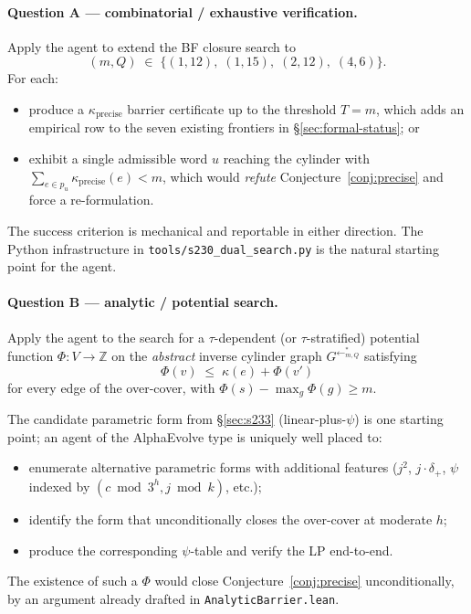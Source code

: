 \documentclass[11pt,a4paper]{article}
\theoremstyle{plain}
\theoremstyle{definition}
\newcommand{\ZZ}{\mathbb{Z}}
\newcommand{\InvG}{G^{\!\leftarrow}}
\begin{document}
\paragraph{Question A — combinatorial / exhaustive verification.}
Apply the agent to extend the BF closure search to
\[
  (m, Q) \;\in\;
  \{ (1, 12),\; (1, 15),\; (2, 12),\; (4, 6) \}.
\]
For each:
\begin{itemize}
  \item produce a $\kappa_{\mathrm{precise}}$ barrier certificate
        up to the threshold $T = m$, which adds an empirical row
        to the seven existing frontiers in
        \S\ref{sec:formal-status}; or
  \item exhibit a single admissible word $u$ reaching the
        cylinder with
        $\sum_{e \in p_u} \kappa_{\mathrm{precise}}(e) < m$,
        which would \emph{refute}
        Conjecture~\ref{conj:precise} and force a re-formulation.
\end{itemize}
The success criterion is mechanical and reportable in either
direction. The Python infrastructure in
\texttt{tools/s230\_dual\_search.py} is the natural starting point
for the agent.

\paragraph{Question B — analytic / potential search.}
Apply the agent to the search for a $\tau$-dependent (or
$\tau$-stratified) potential function
$\Phi : V \to \ZZ$ on the \emph{abstract} inverse cylinder graph
$\InvG^{*}_{m, Q}$ satisfying
\[
   \Phi(v) \;\le\; \kappa(e) + \Phi(v')
\]
for every edge of the over-cover, with
$\Phi(s) - \max_g \Phi(g) \ge m$.

The candidate parametric form from \S\ref{sec:s233}
(linear-plus-$\psi$) is one starting point; an agent of the
AlphaEvolve type is uniquely well placed to:
\begin{itemize}
  \item enumerate alternative parametric forms with additional
        features ($j^2$, $j \cdot \delta_+$, $\psi$ indexed by
        $(c \bmod 3^h, j \bmod k)$, etc.);
  \item identify the form that unconditionally closes the
        over-cover at moderate $h$;
  \item produce the corresponding $\psi$-table and verify the LP
        end-to-end.
\end{itemize}
The existence of such a $\Phi$ would close
Conjecture~\ref{conj:precise} unconditionally, by an argument
already drafted in \texttt{AnalyticBarrier.lean}.
\end{document}
